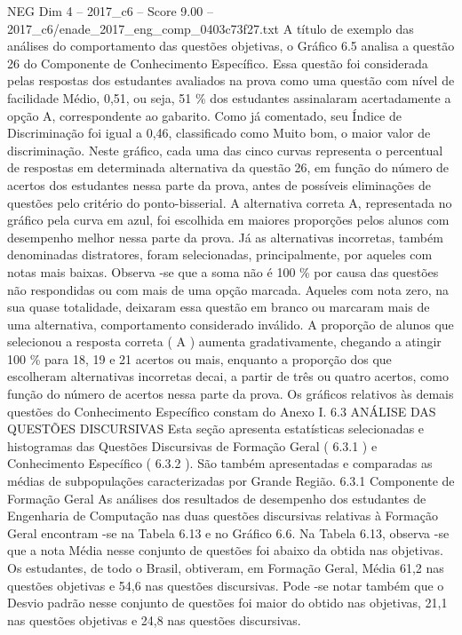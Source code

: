 \begin{textsample}{NEG Dim 4 – 2017\_c6 – Score 9.00 – 2017\_c6/enade\_2017\_eng\_comp\_0403c73f27.txt}
A título de exemplo das análises do comportamento das questões objetivas, o Gráfico 6.5 analisa a questão 26 do Componente de Conhecimento Específico.
Essa questão foi considerada pelas respostas dos estudantes avaliados na prova como uma questão com nível de facilidade Médio, 0,51, ou seja, 51 \% dos estudantes assinalaram acertadamente a opção A, correspondente ao gabarito.
Como já comentado, seu Índice de Discriminação foi igual a 0,46, classificado como Muito bom, o maior valor de discriminação.
Neste gráfico, cada uma das cinco curvas representa o percentual de respostas em determinada alternativa da questão 26, em função do número de acertos dos estudantes nessa parte da prova, antes de possíveis eliminações de questões pelo critério do ponto-bisserial.
A alternativa correta A, representada no gráfico pela curva em azul, foi escolhida em maiores proporções pelos alunos com desempenho melhor nessa parte da prova.
Já as alternativas incorretas, também denominadas distratores, foram selecionadas, principalmente, por aqueles com notas mais baixas.
Observa -se que a soma não é 100 \% por causa das questões não respondidas ou com mais de uma opção marcada.
Aqueles com nota zero, na sua quase totalidade, deixaram essa questão em branco ou marcaram mais de uma alternativa, comportamento considerado inválido.
A proporção de alunos que selecionou a resposta correta ( A ) aumenta gradativamente, chegando a atingir 100 \% para 18, 19 e 21 acertos ou mais, enquanto a proporção dos que escolheram alternativas incorretas decai, a partir de três ou quatro acertos, como função do número de acertos nessa parte da prova.
Os gráficos relativos às demais questões do Conhecimento Específico constam do Anexo I. 6.3 ANÁLISE DAS QUESTÕES DISCURSIVAS Esta seção apresenta estatísticas selecionadas e histogramas das Questões Discursivas de Formação Geral ( 6.3.1 ) e Conhecimento Específico ( 6.3.2 ).
São também apresentadas e comparadas as médias de subpopulações caracterizadas por Grande Região. 6.3.1 Componente de Formação Geral As análises dos resultados de desempenho dos estudantes de Engenharia de Computação nas duas questões discursivas relativas à Formação Geral encontram -se na Tabela 6.13 e no Gráfico 6.6.
Na Tabela 6.13, observa -se que a nota Média nesse conjunto de questões foi abaixo da obtida nas objetivas.
Os estudantes, de todo o Brasil, obtiveram, em Formação Geral, Média 61,2 nas questões objetivas e 54,6 nas questões discursivas.
Pode -se notar também que o Desvio padrão nesse conjunto de questões foi maior do obtido nas objetivas, 21,1 nas questões objetivas e 24,8 nas questões discursivas.

\end{textsample}
